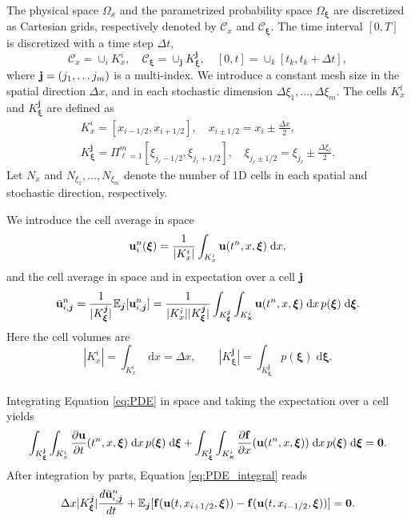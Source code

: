 \documentclass{article}
\newcommand{\bfu}{ {\bf u} }
\newcommand{\bfx}{ {\bf x} }
\newcommand{\bfj}{ {\bf j} }
\newcommand{\ibfj}{ {\boldsymbol{j}  } }
\newcommand{\bfxi}{ {\bm \xi} }
\newcommand{\bff}{ {\bf f} }
\newcommand{\bfzero}{ {\bm 0} }
\newcommand{\E}{ \mathbb E }
\newcommand{\diff}{ \; \text{d} }
\begin{document}
The physical space $\Omega_x$ and the parametrized probability space $\Omega_\bfxi$
are discretized as Cartesian grids, respectively denoted by $\mathcal{C}_x$ and $\mathcal{C}_\bfxi$. 
The time interval $[0,T]$ is discretized with a time step $\Delta t$, 
\[
\mathcal C_x   = \cup_i K_x^i, 
\quad
\mathcal C_\bfxi = \cup_\ibfj K_\bfxi^\ibfj, 
\quad
[0,t]= \cup_k [t_k, t_k + \Delta t], 
\]
where $\bfj=(j_1, \dots j_m)$ is a multi-index.
We introduce a constant mesh size in the spatial direction $\Delta x$,
and in each stochastic dimension $\Delta \xi_1,\dots,\Delta \xi_m$.  
The cells $K_x^i$ and $K_\bfxi^\ibfj$ are defined as 
\begin{align}
    K_x^i = [x_{i-1/2}, x_{i+1/2} ], 
    \quad x_{i \pm 1/2} = x_{i} \pm \frac{\Delta x}{2}, 
    \\
    K_\bfxi^\ibfj = \Pi_{\ell = 1}^m [\xi_{j_\ell-1/2}, \xi_{j_\ell + 1/2} ],
    \quad 
    \xi_{j_\ell\pm 1/2} = \xi_{j_\ell } \pm \frac{\Delta \xi_\ell}{2} .
\end{align}
Let $N_x$ and $N_{\xi_1},\dots,N_{\xi_m}$ denote the number of 1D cells in each spatial and stochastic direction, respectively. 

We introduce the cell average in space
\begin{equation}
    \bfu_{i}^n(\bfxi) =
    \frac{1}{|K_x^i|}
    \int_{K_x^i}  \bfu (t^n,x,\bfxi) \diff x,
\end{equation}
and the cell average in space and in expectation over a cell $\bfj$
\begin{equation}
    \bar \bfu_{i,\ibfj}^n =
    \frac{1}{|K_\bfxi^\ibfj|}
    \E_\ibfj [\bfu_{i,\ibfj}^n]
    =
    \frac{1}{|K_x^i||K_\bfxi^\ibfj|}
    \int_{K_\bfxi^\ibfj}  \int_{K_\bfx^i}  \bfu (t^n ,x,\bfxi)
    \diff x \, p(\bfxi) \diff \bfxi.
\end{equation}
Here the cell volumes are 
\begin{equation}
    |K_x^i| = \int_{K_x^i} \diff x = \Delta x, 
    \qquad 
    |K_\bfxi^\ibfj| = \int_{K_\bfxi^\ibfj} p(\bfxi) \diff \bfxi.
\end{equation}
\\

Integrating Equation \eqref{eq:PDE} in space and taking the expectation over a cell yields   
\begin{equation} \label{eq:PDE_integral}
    \int_{K_\bfxi^\bfj} \int_{K_x^i}
    \frac{\partial \bfu }{\partial t}(t^n ,x,\bfxi)
     \diff x \, p(\bfxi) \diff \bfxi 
    + 
    \int_{K_\bfxi^\bfj} \int_{K_\bfx^i} 
    \frac{\partial \bff}{\partial x} (\bfu (t^n ,x,\bfxi))
     \diff x  \, p(\bfxi) \diff \bfxi 
    = \bfzero. 
\end{equation}
After integration by parts, Equation \eqref{eq:PDE_integral} reads 
\begin{equation}\label{eq:PDE_integral-2}
    \Delta x |K_\bfxi^\ibfj| \frac{d \bar \bfu_{i,\ibfj}^n}{d t}
    + \E_\ibfj [ {\bf f}(\bfu (t,x_{i+1/2},\bfxi) ) - {\bf f}(\bfu (t,x_{i-1/2},\bfxi)) ]
    = \bfzero.
\end{equation}
\end{document}
